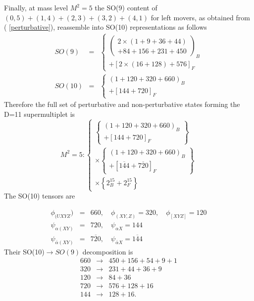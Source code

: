 Finally, at mass level $M^2=5$ the SO(9) content of $(0,5)+(1,4)+(2,3)+%
\left( 3,2\right) +\left( 4,1\right) $ for left movers, as obtained from (%
\ref{perturbative}), reassemble into SO(10) representations as follows
\begin{eqnarray}
SO(9) &=&\left\{
\begin{array}{l}
\left(
\begin{array}{c}
2\times \left( 1+9+36+44\right) \\
+84+156+231+450
\end{array}
\right) _B \\
+\left[ 2\times \left( 16+128\right) +576\right] _F
\end{array}
\right.  \label{l59} \\
SO(10) &=&\left\{
\begin{array}{c}
\left( 1+120+320+660\right) _B \\
+\left[ 144+720\right] _F
\end{array}
\right.  \label{l510}
\end{eqnarray}
Therefore the full set of perturbative and non-perturbative states forming
the D=11 supermultiplet is
\begin{equation}
M^2=5:\left\{
\begin{array}{c}
\left\{
\begin{array}{c}
\left( 1+120+320+660\right) _B \\
+\left[ 144+720\right] _F
\end{array}
\right\} \\
\times \left\{
\begin{array}{c}
\left( 1+120+320+660\right) _B \\
+\left[ \overline{144}+\overline{720}\right] _F
\end{array}
\right\} \\
\times \left\{ 2_B^{15}+2_F^{15}\right\}
\end{array}
\right.
\end{equation}
The SO(10) tensors are

\begin{eqnarray}
\phi _{(UXYZ}) &=&660,\quad \phi _{(XY,Z)}=320,\quad \phi _{[XYZ]}=120
\nonumber \\
\psi _{\alpha (XY)} &=&{{720,\quad \psi _{\alpha X}=144}} \\
\psi _{\bar \alpha (XY)} &=&\overline{{720}}{{,\quad \psi _{\bar \alpha X}=}}%
\overline{{144}}  \nonumber
\end{eqnarray}
Their SO(10)$\rightarrow SO(9)$ decomposition is
\begin{eqnarray}
660 &\rightarrow &450+156+54+9+1  \nonumber \\
320 &\rightarrow &231+44+36+9  \nonumber \\
120 &\rightarrow &84+36 \\
720 &\rightarrow &576+128+16  \nonumber \\
144 &\rightarrow &128+16.  \nonumber
\end{eqnarray}

